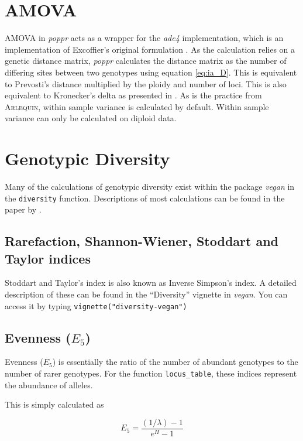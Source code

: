 \documentclass[letterpaper]{article}\usepackage[]{graphicx}\usepackage[]{color}
\newcommand{\poppr}{\textit{poppr}}
\begin{document}
\section{AMOVA}

AMOVA in \poppr{} acts as a wrapper for the \textit{ade4} implementation, which
is an implementation of Excoffier's original formulation
\citep{excoffier1992analysis}. As the calculation relies on a genetic distance
matrix, \poppr{} calculates the distance matrix as the number of differing sites
between two genotypes using equation \ref{eq:ia_D}. This is equivalent to
Prevosti's distance multiplied by the ploidy and number of loci. This is also
equivalent to Kronecker's delta as presented in \citep{excoffier1992analysis}.
As is the practice from \textsc{Arlequin}, within sample variance is calculated
by default. Within sample variance can only be calculated on diploid data.

\section{Genotypic Diversity}

Many of the calculations of genotypic diversity exist within the package
\textit{vegan} in the \texttt{diversity} function. Descriptions of most
calculations can be found in the paper by \cite{Grunwald:2003}.

\subsection{Rarefaction, Shannon-Wiener, Stoddart and Taylor indices}

Stoddart and Taylor's index is also known as Inverse Simpson's index. A detailed
description of these can be found in the ``Diversity'' vignette in
\textit{vegan}. You can access it by typing \texttt{vignette("diversity-vegan")}

\subsection{Evenness ($E_{5}$)}
Evenness ($E_{5}$) is essentially the ratio of the number of abundant genotypes
to the number of rarer genotypes. For the function \texttt{locus\_table}, these
indices represent the abundance of alleles.

This is simply calculated as 

\begin{equation}
E_{5} = \frac{(1/\lambda) - 1}{e^{H} - 1}
\end{equation}
\end{document}
